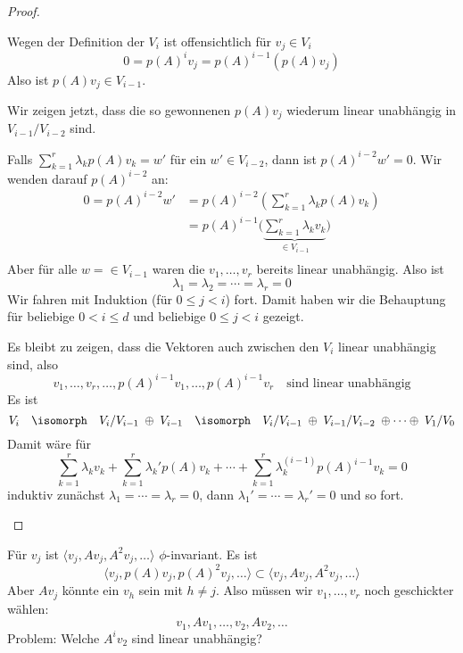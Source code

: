 \documentclass{mycourse}
\begin{document}
\begin{lem}
\begin{proof}
\begin{enumerate}[(a)]
				Wegen der Definition der $V_i$ ist offensichtlich für $v_j\in V_i$
				\[
					0 = p(A)^i v_j = p(A)^{i-1}(p(A)v_j)
				\]
				Also ist $p(A)v_j \in V_{i-1}$.

				Wir zeigen jetzt, dass die so gewonnenen $p(A)v_j$ wiederum linear unabhängig in $V_{i-1}/V_{i-2}$ sind.

				Falls $\sum_{k=1}^r\lambda_kp(A)v_k = w'$ für ein $w'\in V_{i-2}$, dann ist $p(A)^{i-2}w' = 0$.
				Wir wenden darauf $p(A)^{i-2}$ an:
				\begin{align*}
					0= p(A)^{i-2}w' &=p(A)^{i-2}\left(\sum_{k=1}^r\lambda_k p(A)v_k\right) \\
															   &= p(A)^{i-1}\bigg(\underbrace{\sum_{k=1}^r\lambda_kv_k}_{\in V_{i-1}}\bigg)\\
				\end{align*}
				Aber für alle $w= \in V_{i-1}$ waren die $v_1,\dotsc,v_r$ bereits linear unabhängig.
				Also ist
				\[
					\lambda_1 = \lambda_2 = \dotsb = \lambda_r = 0
				\]
				Wir fahren mit Induktion (für $0\le j<i$) fort.
				Damit haben wir die Behauptung für beliebige $0<i\le d$ und beliebige $0\le j<i$ gezeigt.

				Es bleibt zu zeigen, dass die Vektoren auch zwischen den $V_i$ linear unabhängig sind, also
				\[
					v_1, \dotsc, v_r, \dotsc, p(A)^{i-1}v_1, \dotsc, p(A)^{i-1}v_r \quad \text{sind linear unabhängig}
				\]
				Es ist
				\[
					V_i \quad\isomorph\quad V_i/ V_{i-1} \;\oplus\; V_{i-1} \quad\isomorph\quad V_i/V_{i-1} \;\oplus\; V_{i-1}/V_{i-2} \;\oplus \dotsb \oplus\; V_1 / V_0
				\]
				Damit wäre für
				\[
					\sum_{k=1}^r \lambda_kv_k + \sum_{k=1}^r \lambda_k'p(A)v_k + \dotsb + \sum_{k=1}^r \lambda_k^{(i-1)}p(A)^{i-1}v_k = 0
				\]
				induktiv zunächst $\lambda_1=\dotsb=\lambda_r = 0$, dann $\lambda_1'=\dotsb=\lambda_r'=0$ und so fort.
		\end{enumerate}
	\end{proof}
\end{lem}
		

Für $v_j$ ist $\langle v_j, Av_j, A^2v_j, \dotsc\rangle$  $\phi$-invariant.
Es ist
\[
	\langle v_j, p(A)v_j, p(A)^2v_j, \dotsc \rangle \subset \langle v_j, Av_j, A^2v_j, \dotsc\rangle
\]
Aber $Av_j$ könnte ein $v_h$ sein mit $h\neq j$.
Also müssen wir $v_1, \dotsc, v_r$ noch geschickter wählen:
\[
	v_1, Av_1, \dotsc, v_2, Av_2, \dotsc
\]
Problem: Welche $A^iv_2$ sind linear unabhängig?
\end{document}
